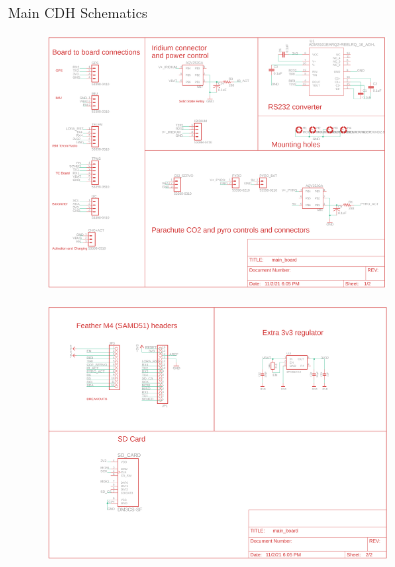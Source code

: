 \documentclass[UKenglish]{beamer}
\begin{document}
\begin{frame}[allowframebreaks]{Main CDH Schematics}
\begin{figure}[H]
	\centering
	\includegraphics[width=0.8\textwidth]{images/main_board_schem_1}
	\label{fig:schematic-cdh-p1}
\end{figure}
\begin{figure}[H]
	\centering
	\includegraphics[width=0.8\textwidth]{images/main_board_schem_2}
	\label{fig:schematic-cdh-p2}
\end{figure}
\end{frame}
\end{document}
